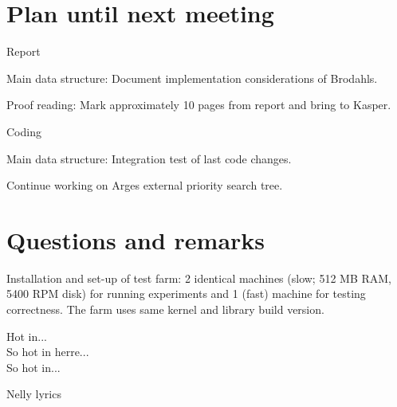 \documentclass[a4paper,11pt,agenda,chair]{meetingmins}
\begin{document}
\section{Plan until next meeting}
\begin{items}
\item Report
	\begin{items}
		\item Main data structure: Document implementation considerations of Brodahls.
		\item Proof reading: Mark approximately 10 pages from report and bring to Kasper.
	\end{items}
\item Coding
	\begin{items}
		\item Main data structure: Integration test of last code changes.
		\item Continue working on Arges external priority search tree.
	\end{items}
\end{items}

\section{Questions and remarks}
\begin{items}
	\item Installation and set-up of test farm: 2 identical machines (slow; 512 MB RAM, 5400 RPM disk) for running experiments and 1 (fast) machine for testing correctness. The farm uses same kernel and library build version.

	\epigraph{Hot in... \\
So hot in herre... \\
So hot in...
}{Nelly lyrics}
	
\end{items}
\end{document}
